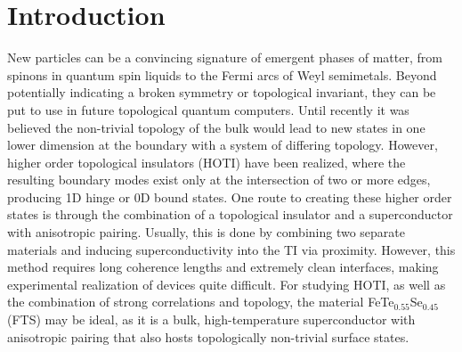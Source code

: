 \section{Introduction}
New particles can be a convincing signature of emergent phases of matter, from spinons in quantum spin liquids\cite{Balents2010} to the Fermi arcs of Weyl semimetals\cite{Armitage2017,Zhang2019}. Beyond potentially indicating a broken symmetry or topological invariant, they can be put to use in future topological quantum computers\cite{Nayak2008}. Until recently it was believed the non-trivial topology of the bulk would lead to new states in one lower dimension at the boundary with a system of differing topology. However, higher order topological insulators (HOTI) have been realized\cite{Schindler2018,Ni2018,Xue2019,Song2017,Langbehn2017,Benalcazar2017}, where the resulting boundary modes exist only at the intersection of two or more edges, producing 1D hinge or 0D bound states. One route to creating these higher order states is through the combination of a topological insulator and a superconductor with anisotropic pairing\cite{Wang2018Corner,DasSarma2018,Zhongbo2018,Ghorashi2019}. Usually, this is done by combining two separate materials and inducing superconductivity into the TI via proximity\cite{Zareapour2012,Albrecht2016,Gazibegovic2017,Kurter2018,Tanaka2012}. However, this method requires long coherence lengths and extremely clean interfaces, making experimental realization of devices quite difficult. For studying HOTI, as well as the combination of strong correlations and topology, the material FeTe$_{0.55}$Se$_{0.45}$ (FTS) may be ideal, as it is a bulk, high-temperature superconductor with anisotropic pairing that also hosts topologically non-trivial surface states\cite{Zhang2018,Wang2015,Wang2018}.
